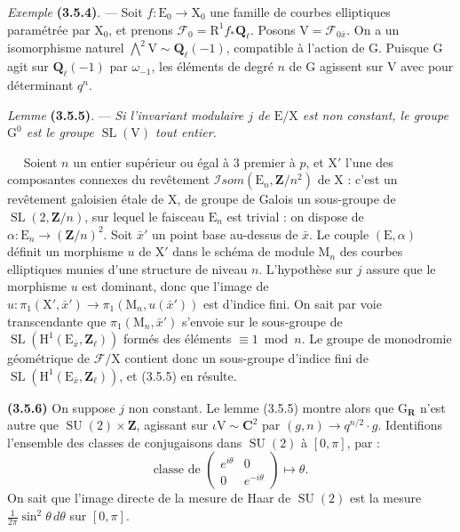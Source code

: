\documentclass[11pt,leqno]{article}
\newcommand{\Page}[1]{\ifvmode\noindent\else\unskip\ \fi{\footnotesize\textcolor{gray}{[p.\,#1]}}\ \ignorespaces}
\begin{document}
\textit{Exemple} \textbf{(3.5.4)}. — Soit \(f:\mathrm E_0\to\mathrm X_0\) une famille de courbes elliptiques paramétrée par \(\mathrm X_0\), et prenons \(\mathscr F_0=\mathrm R^1f_*\mathbf Q_\ell\). Posons \(\mathrm V=\mathscr F_{0\bar x}\). On a un isomorphisme naturel \(\bigwedge\limits^{2}\mathrm V\sim\mathbf Q_\ell(-1)\), compatible à l’action de \(\mathrm G\). Puisque \(\mathrm G\) agit sur \(\mathbf Q_\ell(-1)\) par \(\omega_{-1}\), les éléments de degré \(n\) de \(\mathrm G\) agissent sur \(\mathrm V\) avec pour déterminant \(q^n\).

\textit{Lemme} \textbf{(3.5.5)}. — \textit{Si l’invariant modulaire \(j\) de \(\mathrm E/\mathrm X\) est non constant, le groupe \(\mathrm G^0\) est le groupe \(\operatorname{SL}(\mathrm V)\) tout entier.}

\Page{212}
Soient \(n\) un entier supérieur ou égal à \(3\) premier à \(p\), et \(\mathrm X'\) l’une des composantes connexes du revêtement \(\mathscr I\mathit{som}(\mathrm E_n,\mathbf Z/n^2)\) de \(\mathrm X\) : c’est un revêtement galoisien étale de \(\mathrm X\), de groupe de Galois un sous-groupe de \(\operatorname{SL}(2,\mathbf Z/n)\), sur lequel le faisceau \(\mathrm E_n\) est trivial : on dispose de \(\alpha:\mathrm E_n\to(\mathbf Z/n)^2\). Soit \(\bar x'\) un point base au-dessus de \(\bar x\). Le couple \((\mathrm E,\alpha)\) définit un morphisme \(u\) de \(\mathrm X'\) dans le schéma de module \(\mathrm M_n\) des courbes elliptiques munies d’une structure de niveau \(n\). L’hypothèse sur \(j\) assure que le morphisme \(u\) est dominant, donc que l’image de \(u:\pi_1(\mathrm X',\bar x')\to\pi_1(\mathrm M_n,u(\bar x'))\) est d’indice fini. On sait par voie transcendante que \(\pi_1(\mathrm M_n,\bar x')\) s’envoie sur le sous-groupe de \(\operatorname{SL}(\mathrm H^1(\mathrm E_{\bar x},\mathbf Z_\ell))\) formés des éléments \(\equiv1\bmod n\). Le groupe de monodromie géométrique de \(\mathscr F/\mathrm X\) contient donc un sous-groupe d’indice fini de \(\operatorname{SL}(\mathrm H^1(\mathrm E_{\bar x},\mathbf Z_\ell))\), et (3.5.5) en résulte.

\textbf{(3.5.6)} On suppose \(j\) non constant. Le lemme (3.5.5) montre alors que \(\mathrm G_{\mathbf R}\) n’est autre que \(\operatorname{SU}(2)\times\mathbf Z\), agissant sur \(\iota\mathrm V\sim\mathbf C^2\) par \((g,n)\to q^{n/2}\cdot g\). Identifions l’ensemble des classes de conjugaisons dans \(\operatorname{SU}(2)\) à \([0,\pi]\), par :
\[
\text{classe de }
\begin{pmatrix}
e^{i\theta}&0\\
0&e^{-i\theta}
\end{pmatrix}
\longmapsto\theta.
\]
On sait que l’image directe de la mesure de Haar de \(\operatorname{SU}(2)\) est la mesure \(\displaystyle\frac{1}{2\pi}\sin^2\theta\,d\theta\) sur \([0,\pi]\).
\end{document}

